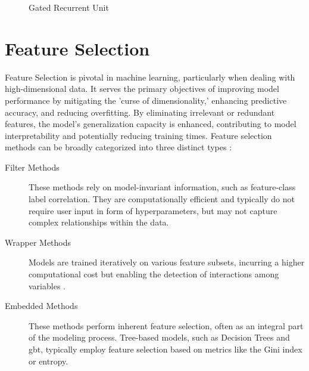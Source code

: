 \documentclass[12pt, a4paper, headinclude, twoside, plainheadsepline, open=right, numbers=noenddot, hidelinks, toc=listof, toc=bibliography]{scrreprt}
\begin{document}
\begin{figure}
\caption{Gated Recurrent Unit}
\label{fig:gru}
\end{figure}


\section{Feature Selection}
\label{sec:fs_algos}

Feature Selection is pivotal in machine learning, particularly when dealing with high-dimensional data. It serves the primary objectives of improving model performance by mitigating the 'curse of dimensionality,' enhancing predictive accuracy, and reducing overfitting. By eliminating irrelevant or redundant features, the model's generalization capacity is enhanced, contributing to model interpretability and potentially reducing training times.
Feature selection methods can be broadly categorized into three distinct types \cite{jovicReviewFeatureSelection2015}:
\begin{description}

\item[Filter Methods] These methods rely on model-invariant information, such as feature-class label correlation. They are computationally efficient and typically do not require user input in form of hyperparameters, but may not capture complex relationships within the data.

\item[Wrapper Methods] Models are trained iteratively on various feature subsets, incurring a higher computational cost but enabling the detection of interactions among variables \cite{venkateshReviewFeatureSelection2019}.

\item[Embedded Methods] These methods perform inherent feature selection, often as an integral part of the modeling process. Tree-based models, such as Decision Trees and \ac{gbt}, typically employ feature selection based on metrics like the Gini index or entropy.
\end{description}
\end{document}
